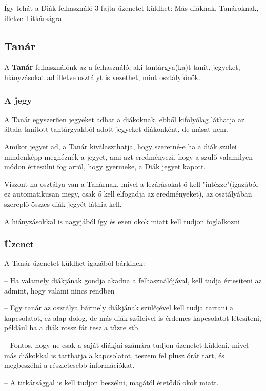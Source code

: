 Így tehát a Diák felhasználó 3 fajta üzenetet küldhet: Más diáknak, Tanároknak, illetve Titkárságra.


\subsection{Tanár}\label{subsec:RESZLETESLEIRAS:cel:tanar}
A {\bf Tanár} felhasználónk az a felhasználó, aki tantárgya(ka)t tanít, jegyeket, hiányzásokat ad illetve osztályt is vezethet, mint osztályfőnök.

\subsubsection{A jegy}\label{subsubsec:RESZLETESLEIRAS:cel:tanar:jegy}
A Tanár egyszerűen jegyeket adhat a diákoknak, ebből kifolyólag láthatja az általa tanított tantárgyakból adott jegyeket diákonként, de másat nem.

Amikor jegyet ad, a Tanár kiválaszthatja, hogy szeretné-e ha a diák szülei mindenképp megnéznék a jegyet, ami azt eredményezi, hogy a szülő valamilyen módon értesülni fog arról, hogy gyermeke, a Diák jegyet kapott.

Viszont ha osztálya van a Tanárnak, mivel a lezárásokat ő kell "intézze"(igazából ez automatikusan megy, csak ő kell elfogadja az eredményeket), az osztályában szereplő összes diák jegyét látnia kell. 

A hiányzásokkal is nagyjából így és ezen okok miatt kell tudjon foglalkozni
\subsubsection{Üzenet}\label{subsubsec:RESZLETESLEIRAS:cel:tanar:uzenet}
A Tanár üzenetet küldhet igazából bárkinek:
\renewcommand{\baselinestretch}{0.98}\normalsize
\begin{description}
    \setlength{\itemsep}{0.04mm}
    \item[Az Adminnak] -- Ha valamely diákjának gondja akadna a felhasználójával, kell tudja értesíteni az admint, hogy valami nincs rendben
    \item[Bármely Szülővel] -- Egy tanár az osztálya bármely diákjának szülőjével kell tudja tartani a kapcsolatot, ez alap dolog, de más diák szüleivel is érdemes kapcsolatot létesíteni, például ha a diák rossz fát tesz a tűzre stb.
    \item[Bármely Diákkal] -- Fontos, hogy ne csak a saját diákjai számára tudjon üzenetet küldeni, mivel más diákokkal is tarthatja a kapcsolatot, teszem fel plusz órát tart, és megbeszélni a részletesebb információkat.
    \item[Titkárral] -- A titkársággal is kell tudjon beszélni, magától étetődő okok miatt.
\end{description}

